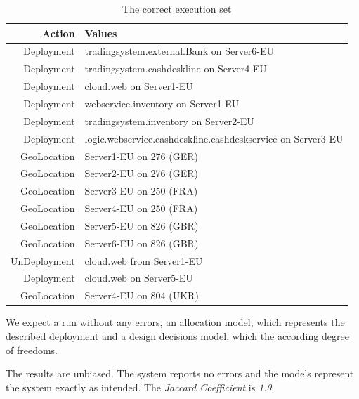 \begin{table}[h]
	\centering
	\begin{tabular}{r | l}
		\hline
		\textbf{Action} & \textbf{Values}\\
		\hline
		Deployment & tradingsystem.external.Bank on Server6-EU\\
		Deployment & tradingsystem.cashdeskline on Server4-EU\\
		Deployment & cloud.web on Server1-EU\\
		Deployment & webservice.inventory on Server1-EU\\
		Deployment & tradingsystem.inventory on Server2-EU\\
		Deployment & logic.webservice.cashdeskline.cashdeskservice on Server3-EU\\
		GeoLocation & Server1-EU on 276 (GER)\\
		GeoLocation & Server2-EU on 276 (GER)\\
		GeoLocation & Server3-EU on 250 (FRA)\\
		GeoLocation & Server4-EU on 250 (FRA)\\
		GeoLocation & Server5-EU on 826 (GBR)\\
		GeoLocation & Server6-EU on 826 (GBR)\\
		UnDeployment & cloud.web from Server1-EU\\
		Deployment & cloud.web on Server5-EU\\
		GeoLocation & Server4-EU on 804 (UKR)\\
		\hline
		\end{tabular}
	\caption{The correct execution set}
	\label{tab:valid_run}
\end{table}

We expect a run without any errors, an allocation model, which represents the described deployment and a design decisions model, which the according degree of freedoms.

The results are unbiased. The system reports no errors and the models represent the system exactly as intended. The \textit{Jaccard Coefficient} is \textit{1.0}.

